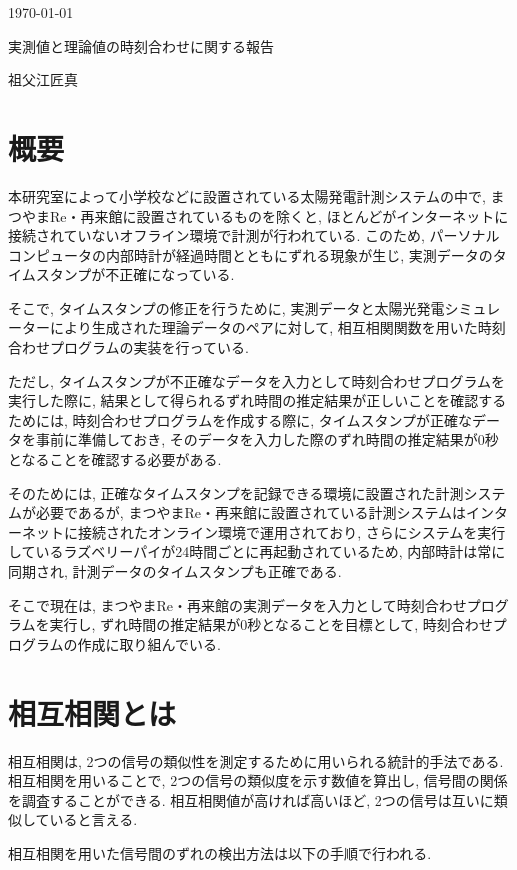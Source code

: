 \documentclass[a4j,12pt,]{jarticle}
\begin{document}
{\noindent\small  \hfill\today}
\begin{center}
  {\Large 実測値と理論値の時刻合わせに関する報告}
\end{center}
\begin{flushright}
  祖父江匠真 \\
\end{flushright}

\section{概要}
本研究室によって小学校などに設置されている太陽発電計測システムの中で, まつやまRe・再来館に設置されているものを除くと, ほとんどがインターネットに接続されていないオフライン環境で計測が行われている. このため, パーソナルコンピュータの内部時計が経過時間とともにずれる現象が生じ, 実測データのタイムスタンプが不正確になっている. 

そこで, タイムスタンプの修正を行うために, 実測データと太陽光発電シミュレーターにより生成された理論データのペアに対して, 相互相関関数を用いた時刻合わせプログラムの実装を行っている. 

ただし, タイムスタンプが不正確なデータを入力として時刻合わせプログラムを実行した際に, 結果として得られるずれ時間の推定結果が正しいことを確認するためには, 時刻合わせプログラムを作成する際に, タイムスタンプが正確なデータを事前に準備しておき, そのデータを入力した際のずれ時間の推定結果が0秒となることを確認する必要がある. 

そのためには, 正確なタイムスタンプを記録できる環境に設置された計測システムが必要であるが, まつやまRe・再来館に設置されている計測システムはインターネットに接続されたオンライン環境で運用されており, さらにシステムを実行しているラズベリーパイが24時間ごとに再起動されているため, 内部時計は常に同期され, 計測データのタイムスタンプも正確である. 

そこで現在は, まつやまRe・再来館の実測データを入力として時刻合わせプログラムを実行し, ずれ時間の推定結果が0秒となることを目標として, 時刻合わせプログラムの作成に取り組んでいる. 

\section{相互相関とは}
相互相関は, 2つの信号の類似性を測定するために用いられる統計的手法である. 相互相関を用いることで, 2つの信号の類似度を示す数値を算出し, 信号間の関係を調査することができる. 相互相関値が高ければ高いほど, 2つの信号は互いに類似していると言える. 

相互相関を用いた信号間のずれの検出方法は以下の手順で行われる. 
\end{document}
